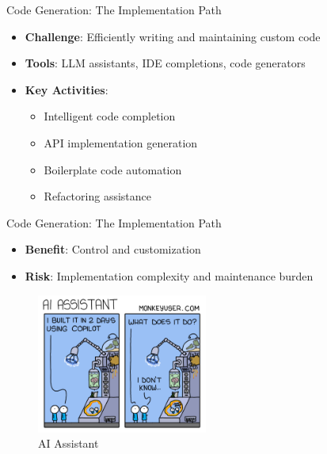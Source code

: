 \documentclass{beamer}
\begin{document}
\begin{frame}[t]{Code Generation: The Implementation Path}
\begin{itemize}
\item \textbf{Challenge}: Efficiently writing and maintaining custom code
\item \textbf{Tools}: LLM assistants, IDE completions, code generators
\item \textbf{Key Activities}:
  \begin{itemize}
  \item Intelligent code completion
  \item API implementation generation
  \item Boilerplate code automation
  \item Refactoring assistance
  \end{itemize}
\end{itemize}
\end{frame}
\begin{frame}[t]{Code Generation: The Implementation Path}
\begin{itemize}
\item \textbf{Benefit}: Control and customization
\item \textbf{Risk}: Implementation complexity and maintenance burden
\end{itemize}
    \begin{figure}
        \includegraphics[width=0.5\textwidth]{images/266-ai-app-gen.png}
        \caption{AI Assistant}
    \end{figure}
\end{frame}
\end{document}
